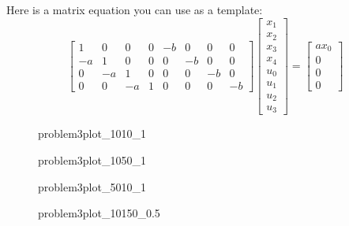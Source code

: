 Here is a matrix equation you can use as a template:
\begin{equation}
\begin{bmatrix}
 1 &  0 &  0 & 0 & -b &  0 &  0 &  0 \\
-a &  1 &  0 & 0 &  0 & -b &  0 &  0 \\
 0 & -a &  1 & 0 &  0 &  0 & -b &  0 \\
 0 &  0 & -a & 1 &  0 &  0 &  0 & -b                                
\end{bmatrix}
\begin{bmatrix} x_1 \\ x_2 \\ x_3 \\ x_4 \\ u_0 \\ u_1 \\ u_2 \\ u_3 \end{bmatrix}
=
\begin{bmatrix}
ax_0 \\ 0 \\ 0 \\ 0      
\end{bmatrix}
\end{equation}




\begin{figure}[htbp]
	\centering
	\caption{problem3plot\_1010\_1}
	\label{fig:problem3plot_1010_1}%
\end{figure}

\begin{figure}[htbp]
	\centering
	\caption{problem3plot\_1050\_1}
	\label{fig:problem3plot_1050_1}%
\end{figure}

\begin{figure}[htbp]
	\centering
	\caption{problem3plot\_5010\_1}
	\label{fig:problem3plot_5010_1}%
\end{figure}

\begin{figure}[htbp]
	\centering
	\caption{problem3plot\_10150\_0.5}
	\label{fig:problem3plot_10150_0.5}%
\end{figure}